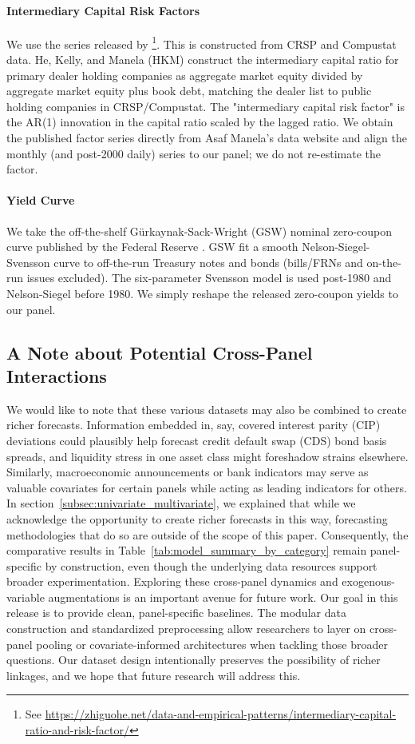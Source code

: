 \documentclass{article}
\begin{document}
\paragraph{Intermediary Capital Risk Factors}
We use the series released by \citet{He2017}\footnote{See \url{https://zhiguohe.net/data-and-empirical-patterns/intermediary-capital-ratio-and-risk-factor/}}. This is constructed from CRSP and Compustat data.
He, Kelly, and Manela (HKM) construct the intermediary capital ratio for primary dealer holding companies as aggregate market equity divided by aggregate market equity plus book debt, matching the dealer list to public holding companies in CRSP/Compustat. The "intermediary capital risk factor" is the AR(1) innovation in the capital ratio scaled by the lagged ratio. We obtain the published factor series directly from Asaf Manela's data website and align the monthly (and post-2000 daily) series to our panel; we do not re-estimate the factor.


\paragraph{Yield Curve}
We take the off-the-shelf Gürkaynak-Sack-Wright (GSW) nominal zero-coupon curve published by the Federal Reserve \citep{Gurkaynak2007}. GSW fit a smooth Nelson-Siegel-Svensson curve to off-the-run Treasury notes and bonds (bills/FRNs and on-the-run issues excluded). The six-parameter Svensson model is used post-1980 and Nelson-Siegel before 1980. We simply reshape the released zero-coupon yields to our panel. 


\subsection{A Note about Potential Cross-Panel Interactions}\label{subsec:cross_panel}

We would like to note that these various datasets may also be combined to create richer forecasts.
Information embedded in, say, covered interest parity (CIP) deviations could plausibly help forecast credit default swap (CDS) bond basis spreads, and liquidity stress in one asset class might foreshadow strains elsewhere. Similarly, macroeconomic announcements or bank indicators may serve as valuable covariates for certain panels while acting as leading indicators for others.
In section~\ref{subsec:univariate_multivariate}, we explained that while we acknowledge the opportunity
to create richer forecasts in this way, forecasting methodologies that do so are outside of the scope of this paper.
Consequently, the comparative results in Table~\ref{tab:model_summary_by_category} remain panel-specific by construction, even though the underlying data resources support broader experimentation. Exploring these cross-panel dynamics and exogenous-variable augmentations is an important avenue for future work. Our goal in this release is to provide clean, panel-specific baselines. The modular data construction and standardized preprocessing allow researchers to layer on cross-panel pooling or covariate-informed architectures when tackling those broader questions.
Our dataset design intentionally preserves the possibility of richer linkages, and we hope that future research will address this.  
\end{document}
